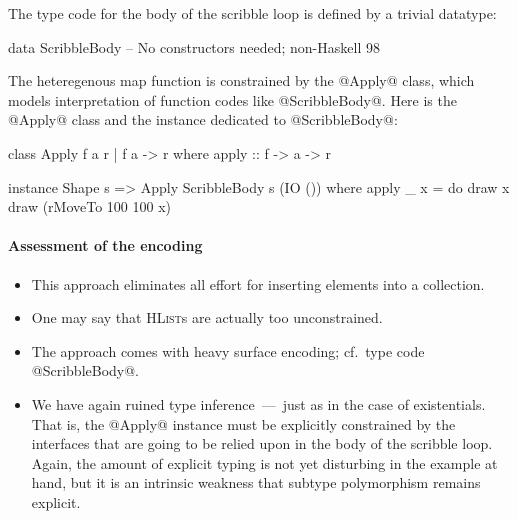 \documentclass{jfp}
\newcommand{\HList}{\textsc{HList}}
\begin{document}
The type code for the body of the scribble loop is defined by a
trivial datatype:

\begin{code}
 data ScribbleBody -- No constructors needed; non-Haskell 98
\end{code}

The heteregenous map function is constrained by the @Apply@ class,
which models interpretation of function codes like @ScribbleBody@.
Here is the @Apply@ class and the instance dedicated to
@ScribbleBody@:

\begin{code}
 class  Apply f a r | f a -> r
  where apply :: f -> a -> r
\end{code}

\begin{code}
 instance Shape s => Apply ScribbleBody s (IO ())
  where
   apply _ x = 
      do
         draw x
         draw (rMoveTo 100 100 x)
\end{code}



\paragraph{Assessment of the encoding}

\mbox{}

\begin{itemize}

\item 
This approach eliminates all effort for inserting elements into a
collection.

\smallskip

\item
One may say that \HList{}s are actually too unconstrained. 

\smallskip

\item 
The approach comes with heavy surface encoding; cf.\ type code
@ScribbleBody@.

\smallskip

\item
We have again ruined type inference~---~just as in the case of
existentials. That is, the @Apply@ instance must be explicitly
constrained by the interfaces that are going to be relied upon in the
body of the scribble loop. Again, the amount of explicit typing is not
yet disturbing in the example at hand, but it is an intrinsic weakness
that subtype polymorphism remains explicit.

\end{itemize}
\end{document}
